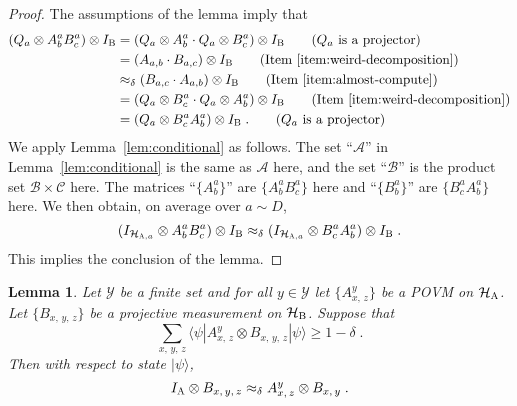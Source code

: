 \documentclass[11pt]{article}
\newtheorem{lemma}[theorem]{Lemma}
\theoremstyle{definition}
\newcommand{\ket}[1]{|#1\rangle}
\newcommand{\bra}[1]{\langle#1|}
\newcommand{\Id}{\ensuremath{I}}
\newcommand{\mA}{\ensuremath{\mathcal{A}}}
\newcommand{\mB}{\ensuremath{\mathcal{B}}}
\newcommand{\mC}{\ensuremath{\mathcal{C}}}
\newcommand{\mH}{\ensuremath{\mathcal{H}}}
\newcommand{\ia}{\Id_\alice}
\newcommand{\labelstyle}[1]{\ensuremath{\textsc{#1}}\xspace}
\newcommand{\alice}{\labelstyle{A}}
\newcommand{\bob}{\labelstyle{B}}
\renewcommand{\cal}[1]{\mathcal{#1}}
\begin{document}
\begin{proof}
  The assumptions of the lemma imply that
  \begin{align*}
    (Q_a \otimes A^a_b B^a_c) \otimes \Id_\bob
    & = (Q_a \otimes A^a_b \cdot Q_a \otimes B^a_c) \otimes \Id_\bob
      \tag{$Q_a$ is a projector}\\
    & = (A_{a, b} \cdot B_{a, c}) \otimes \Id_\bob
      \tag{Item~\ref{item:weird-decomposition}}\\
    & \approx_\delta (B_{a, c} \cdot A_{a, b}) \otimes \Id_\bob
      \tag{Item~\ref{item:almost-compute}}\\
    & = (Q_a \otimes B^a_c \cdot Q_a \otimes A^a_b) \otimes \Id_\bob
      \tag{Item~\ref{item:weird-decomposition}}\\
    & = (Q_a \otimes B^a_c A^a_b) \otimes \Id_\bob\;.
      \tag{$Q_a$ is a projector}
  \end{align*}
  We apply Lemma~\ref{lem:conditional} as follows.
  The set ``$\mA$'' in Lemma~\ref{lem:conditional} is the same as $\cal{A}$
  here, and the set ``$\mB$'' is the product set $\mB \times \mC$ here.
  The matrices ``$\{A^a_b\}$'' are $\{A^a_{b}B^a_c\}$ here and ``$\{B^{a}_b\}$''
  are $\{B^a_c A^a_{b}\}$ here.
  We then obtain, on average over $a \sim
  D$,
  \begin{equation*}
    (\Id_{\mH_{\alice, a}}\otimes A^{a}_b B^a_c) \otimes \Id_\bob
    \approx_\delta (\Id_{\mH_{\alice, a}} \otimes B^{a}_c A^a_b) \otimes \Id_\bob\;.
  \end{equation*}
  This implies the conclusion of the lemma.
\end{proof}

\begin{lemma}
  \label{lem:conditional-consistency}
	Let $ \cal{Y}$ be a finite set and for all $y\in \cal{Y}$ let $\{A^y_{x,\, z}\}$ be a POVM on $\mH_\alice$. Let 
  $\{B_{x,\, y,\, z}\}$ be a projective measurement on $\mH_\bob$.
  Suppose that
  \begin{equation}\label{eq:cc-1}
    \sum_{x,\, y,\, z} \bra{\psi} A^y_{x,\, z} \otimes B_{x,\, y,\, z}
    \ket{\psi} \ge 1 - \delta\;.
  \end{equation}
  Then with respect to state $\ket{\psi}$,
  \begin{equation*}
    \ia \otimes B_{x,\, y,\, z} \approx_\delta A^y_{x,\, z} \otimes B_{x,\,
      y}\;.
  \end{equation*}
\end{lemma}
\end{document}
